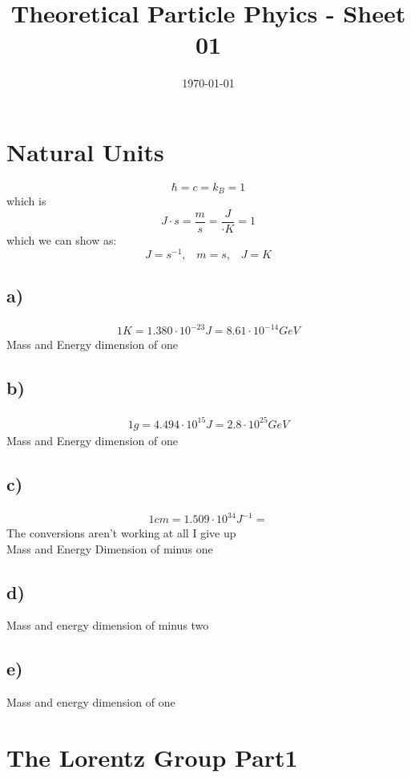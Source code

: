 \documentclass[]{scrartcl}
\title{Theoretical Particle Phyics - Sheet 01}
\author{}
\date{\today}
\begin{document}
\maketitle
\newpage
\tableofcontents
\newpage

\section{Natural Units} 

$$
\hbar = c = k_B = 1
$$
which is
$$
J\cdot s = \frac{m}{s} = \frac{J}{\cdot K} = 1
$$
which we can show as:
$$
J = s^{-1},\;\;\; m = s,\;\;\; J = K
$$

\subsection{a)}
\begin{gather}
	1K = 1.380\cdot10^{-23}J = 8.61\cdot10^{-14}GeV
\end{gather}
Mass and Energy dimension of one

\subsection{b)}

\begin{gather}
	1g = 4.494\cdot10^{15}J = 2.8\cdot10^{25}GeV
\end{gather}
Mass and Energy dimension of one

\subsection{c)}

\begin{gather}
	1cm = 1.509\cdot10^{34}J^{-1} = 
\end{gather}
The conversions aren't working at all I give up\\
Mass and Energy Dimension of minus one

\subsection{d)}

Mass and energy dimension of minus two 

\subsection{e)}
Mass and energy dimension of one

\section{The Lorentz Group Part1}
\end{document}
